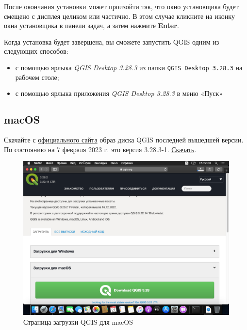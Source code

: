 \documentclass[
  12pt,
]{book}
\providecommand{\tightlist}{%
  \setlength{\itemsep}{0pt}\setlength{\parskip}{0pt}}
\begin{document}
После окончания установки может произойти так, что окно установщика будет смещено с дисплея целиком или частично. В этом случае кликните на иконку окна установщика в панели задач, а затем нажмите \textbf{Enter}.

Когда установка будет завершена, вы сможете запустить QGIS одним из следующих способов:

\begin{itemize}
\tightlist
\item
  с помощью ярлыка \emph{QGIS Desktop 3.28.3} из папки \texttt{QGIS\ Desktop\ 3.28.3} на рабочем столе;
\item
  с помощью ярлыка приложения \emph{QGIS Desktop 3.28.3} в меню «Пуск»
\end{itemize}

\hypertarget{macos}{%
\subsection*{macOS}\label{macos}}

Скачайте с \href{https://qgis.org/ru/site/forusers/download.html}{официального сайта} образ диска QGIS последней вышедшей версии. По состоянию на 7 февраля 2023 г. это версия 3.28.3-1. \href{https://qgis.org/downloads/macos/qgis-macos-pr.dmg}{Скачать}.

\begin{figure}
\centering
\includegraphics{images/installation_instruction_mac/mac01.png}
\caption{Страница загрузки QGIS для macOS}
\end{figure}
\end{document}
